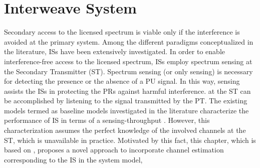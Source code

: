 \chapter{Interweave System}
\label{chap:IS}
Secondary access to the licensed spectrum is viable only if the interference is avoided at the primary system. %
Among the different paradigms conceptualized in the literature, ISs have been extensively investigated. %
In order to enable interference-free access to the licensed spectrum, ISs employ spectrum sensing at the Secondary Transmitter (ST). 
Spectrum sensing (or only sensing) is necessary for detecting the presence or the absence of a PU signal. In this way, sensing assists the ISs in protecting the PRs against harmful interference.  at the ST can be accomplished by listening to the signal transmitted by the PT.
The existing models termed as baseline models investigated in the literature \cite{Liang08, Sharma14, Pradhan15} characterize the performance of IS in terms of a sensing-throughput . However, this characterization assumes the perfect knowledge of the involved channels at the ST, which is unavailable in practice. 
Motivated by this fact, this chapter, which is based on , proposes a novel approach to incorporate channel estimation corresponding to the IS in the system model, %
